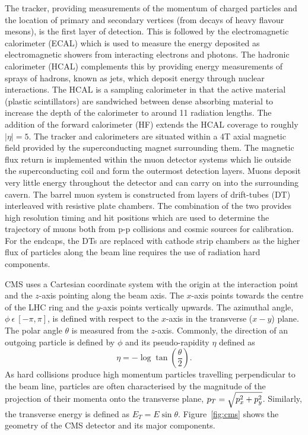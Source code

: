 The tracker, providing measurements of the momentum of charged particles and the location of 
primary and secondary vertices (from decays of heavy flavour mesons), is the first layer of detection.
This is followed by the electromagnetic calorimeter (ECAL) which is used to measure
the energy deposited as electromagnetic showers from interacting electrons and photons. 
The hadronic calorimeter (HCAL) complements this by providing energy measurements of 
sprays of hadrons, known as jets, which deposit energy through nuclear interactions. 
The HCAL is a sampling calorimeter in that the active material (plastic scintillators)
are sandwiched between dense absorbing material to increase the depth of the calorimeter to
around 11 radiation lengths. The addition of the forward calorimeter (HF) extends the HCAL
coverage to roughly $|\eta|=5$.  
The tracker and calorimeters are situated within a 4T axial magnetic field 
provided by the superconducting magnet surrounding them.
The magnetic flux return is implemented within the  muon detector systems which lie outside 
the superconducting coil and form the outermost detection layers. Muons deposit very little energy 
throughout the detector and can carry on into the surrounding cavern.
The barrel muon system is constructed from layers of drift-tubes (DT) interleaved with 
resistive plate chambers. The combination of the two provides high resolution
timing and hit positions which are used to determine the trajectory of muons both from
p-p collisions and cosmic sources for calibration. For the endcaps, the DTs are replaced
with cathode strip chambers as the higher flux of particles along the beam line
requires the use of radiation hard components.

CMS uses a Cartesian coordinate system with the origin at the 
interaction point and the $z$-axis pointing along the beam axis. The $x$-axis points towards 
the centre of the LHC ring and the $y$-axis points vertically upwards. The azimuthal angle, 
$\phi~\epsilon~[-\pi,\pi]$, is defined with respect to the $x$-axis in the 
transverse ($x-y$) plane. The polar angle $\theta$ is measured from the $z$-axis. Commonly,
the direction of an outgoing particle is defined by $\phi$ and its pseudo-rapidity $\eta$ 
defined as 
\begin{equation}
	\eta=-\log \tan \left( \frac{\theta}{2} \right).
\end{equation}
As hard collisions produce high momentum particles travelling perpendicular to the beam line, 
particles are often characterised
by the magnitude of the projection of their momenta onto the transverse plane, 
$p_{T}=\sqrt{p_{x}^{2}+p_{y}^{2}}$.
Similarly, the transverse energy is defined as $E_{T}=E\sin\theta$.
Figure~\ref{fig:cms} shows the geometry of the CMS detector and its major components. 

